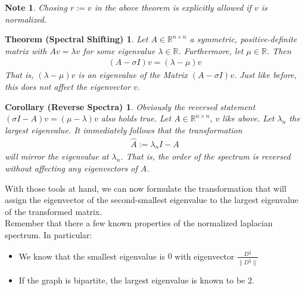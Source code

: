 \documentclass[10pt, a4paper, twocolumn]{article} %
\begin{document}
\newtheorem{Brauer Param Note}[]{Note}[section]
\begin{Brauer Param Note}
Chosing $r:=v$ in the above theorem is explicitly allowed if $v$ is normalized.
\end{Brauer Param Note}

\newtheorem{Spectral Shifting}[]{Theorem (Spectral Shifting)}[section]
\begin{Spectral Shifting}
	Let $A \in \mathbb{R}^{n \times n}$ a symmetric, positive-definite matrix with $Av=\lambda v$ for some eigenvalue $\lambda \in \mathbb{R}$.
	Furthermore, let $\mu \in \mathbb{R}$. Then
	\begin{align}
		(A - \sigma I)v = (\lambda - \mu)v
	\end{align}
That is, $(\lambda - \mu)v$ is an eigenvalue of the Matrix $(A - \sigma I)v$. Just like before, this does not affect the
eigenvector $v$.
\end{Spectral Shifting}

\newtheorem{Reversal}[]{Corollary (Reverse Spectra)}[section]
\begin{Reversal}
	Obviously the reversed statement $(\sigma I - A)v = (\mu - \lambda)v$ also holds true.
	Let $A \in \mathbb{R}^{n \times n}$, $v$ like above. Let $\lambda_n$ the largest eigenvalue.
	It immediately follows that the transformation
	\begin{align}
		\hat{A} := \lambda_n I - A
	\end{align}
	will mirror the eigenvalue at $\lambda_n$. That is, the order of the spectrum is reversed without affecting any eigenvectors of $A$.
\end{Reversal}
With those tools at hand, we can now formulate the transformation that will assign the eigenvector of the
second-smallest eigenvalue to the largest eigenvalue of the transformed matrix.
\\
Remember that there a few known properties of the normalized laplacian spectrum. In particular:
\begin{itemize}
	\item We know that the smallest eigenvalue is $0$ with eigenvector $\frac{D^\frac{1}{2}}{\lVert D^\frac{1}{2} \rVert}$ %
	\item If the graph is bipartite, the largest eigenvalue is known to be $2$.
\end{itemize}
\end{document}
